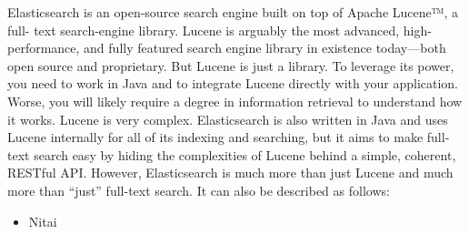 
Elasticsearch is an open-source search engine built on top of Apache Lucene™, a full-
text search-engine library. Lucene is arguably the most advanced, high-performance,
and fully featured search engine library in existence today—both open source and
proprietary.
But Lucene is just a library. To leverage its power, you need to work in Java and to
integrate Lucene directly with your application. Worse, you will likely require a
degree in information retrieval to understand how it works. Lucene is very complex.
Elasticsearch is also written in Java and uses Lucene internally for all of its indexing
and searching, but it aims to make full-text search easy by hiding the complexities of
Lucene behind a simple, coherent, RESTful API.
However, Elasticsearch is much more than just Lucene and much more than “just”
full-text search. It can also be described as follows:
\begin{itemize}
	\item Nitai
\end{itemize}

